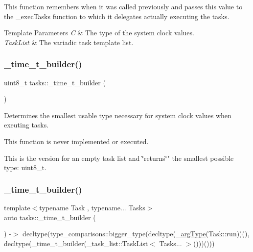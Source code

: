 This function remembers when it was called previously and passes this value to the \+\_\+exec\+Tasks function to which it delegates actually executing the tasks.


\begin{DoxyTemplParams}{Template Parameters}
{\em C} & The type of the system clock values. \\
\hline
{\em Task\+List} & The variadic task template list. \\
\hline
\end{DoxyTemplParams}
\hypertarget{namespacetasks_a9469b8fb917e0f3ec0168293ac046a4c}{}\label{namespacetasks_a9469b8fb917e0f3ec0168293ac046a4c} 
\subsubsection{\texorpdfstring{\+\_\+time\+\_\+t\+\_\+builder()}{\_time\_t\_builder()}\hspace{0.1cm}{\footnotesize\ttfamily [1/2]}}
{\footnotesize\ttfamily uint8\+\_\+t tasks\+::\+\_\+time\+\_\+t\+\_\+builder (\begin{DoxyParamCaption}\item[{const \+\_\+task\+\_\+list\+::\+Task\+List$<$$>$ \&}]{ }\end{DoxyParamCaption})}



Determines the smallest usable type necessary for system clock values when exeuting tasks. 

This function is never implemented or executed.

This is the version for an empty task list and \char`\"{}returns\char`\"{}" the smallest possible type\+: uint8\+\_\+t. \hypertarget{namespacetasks_ac1dcc4748bce4b593356740b7a26343c}{}\label{namespacetasks_ac1dcc4748bce4b593356740b7a26343c} 
\subsubsection{\texorpdfstring{\+\_\+time\+\_\+t\+\_\+builder()}{\_time\_t\_builder()}\hspace{0.1cm}{\footnotesize\ttfamily [2/2]}}
{\footnotesize\ttfamily template$<$typename Task , typename... Tasks$>$ \\
auto tasks\+::\+\_\+time\+\_\+t\+\_\+builder (\begin{DoxyParamCaption}\item[{const \+\_\+task\+\_\+list\+::\+Task\+List$<$ Task, Tasks... $>$ \&}]{ }\end{DoxyParamCaption}) -\/$>$  decltype(type\+\_\+comparisons\+::bigger\+\_\+type(decltype(\hyperlink{namespacetasks_ac4a797a86584958bef0b67616a38c8ae}{\+\_\+arg\+Type}(Task\+::run))(), decltype(\+\_\+time\+\_\+t\+\_\+builder(\+\_\+task\+\_\+list\+::\+Task\+List$<$ Tasks... $>$()))()))}



